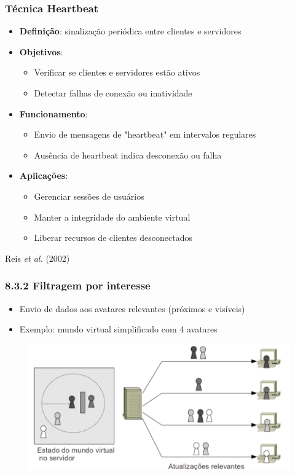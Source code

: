 \documentclass{beamer}
\begin{document}
\begin{frame}
  \frametitle{Técnica Heartbeat}
  \begin{itemize}
    \item \textbf{Definição}: sinalização periódica entre clientes e servidores
    \item \textbf{Objetivos}:
    \begin{itemize}
      \item Verificar se clientes e servidores estão ativos
      \item Detectar falhas de conexão ou inatividade
    \end{itemize}
    \item \textbf{Funcionamento}:
    \begin{itemize}
      \item Envio de mensagens de "heartbeat" em intervalos regulares
      \item Ausência de heartbeat indica desconexão ou falha
    \end{itemize}
    \item \textbf{Aplicações}:
    \begin{itemize}
      \item Gerenciar sessões de usuários
      \item Manter a integridade do ambiente virtual
      \item Liberar recursos de clientes desconectados
    \end{itemize}
  \end{itemize}
  \begin{flushright}
    \scriptsize
    Reis \textit{et al.} (2002)
  \end{flushright}
\end{frame}


\begin{frame} 
  \frametitle{8.3.2 Filtragem por interesse}
  \begin{itemize}
    \item Envio de dados aos avatares relevantes (próximos e visíveis)
    \item Exemplo: mundo virtual simplificado com 4 avatares
  \end{itemize}
  \begin{figure}[h]
    \centering
    \vspace{-18pt}
    \includegraphics[width=1.03\textwidth]{imagem_82.png}
    \vspace{-20pt}
  \end{figure}
\end{frame}
\end{document}
